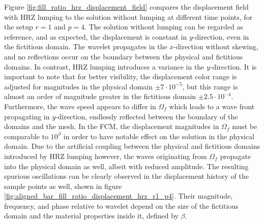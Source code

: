 Figure \ref{fig:fill_ratio_hrz_displacement_field} compares the displacement field with HRZ lumping to the solution without lumping at different time points, for the setup $r=1$ and $p=4$. The solution without lumping can be regarded as reference, and as expected, the displacement is constant in $y$-direction, even in the fictitious domain. The wavelet propagates in the $x$-direction without skewing, and no reflections occur on the boundary between the physical and fictitious domains. 
In contrast, HRZ lumping introduces a variance in the $y$-direction. It is important to note that for better visibility, the displacement color range is adjusted for magnitudes in the physical domain $\pm 7\cdot 10^{-5}$, but this range is almost an order of magnitude greater in the fictitious domain $\pm 2.5 \cdot 10^{-4}$.
Furthermore, the wave speed appears to differ in $\Omega_f$ which leads to a wave front propagating in $y$-direction, endlessly reflected between the boundary of the domains and the mesh. 
In the FCM, the displacement magnitudes in $\Omega_f$ must be comparable to  $10^{\beta}$ in order to have notable effect on the solution in the physical domain.
Due to the artificial coupling between the physical and fictitious domains introduced by HRZ lumping however, the waves originating from $\Omega_f$ propagate into the physical domain as well, albeit with reduced amplitude. The resulting spurious oscillations can be clearly observed in the displacement history of the sample points as well, shown in figure \ref{fig:aligned_bar_fill_ratio_displacement_hrz_r1_p4}. Their magnitude, frequency, and phase relative to wavelet depend on the size of the fictitious domain and the material properties inside it, defined by $\beta$.

